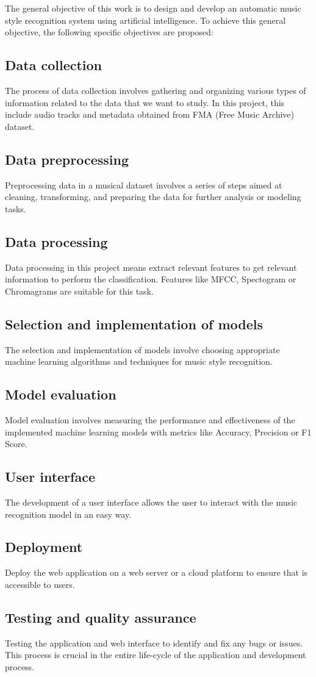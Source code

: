 The general objective of this work is to design and develop an automatic music style recognition system using artificial intelligence. 
To achieve this general objective, the following specific objectives are proposed:

\subsection{Data collection}
The process of data collection involves gathering and organizing various types of information related to the data that we want to study. In this project, this include audio tracks and metadata obtained from FMA (Free Music Archive) dataset.
\subsection{Data preprocessing}
Preprocessing data in a musical dataset involves a series of steps aimed at cleaning, transforming, and preparing the data for further analysis or modeling tasks.
\subsection{Data processing}
Data processing in this project means extract relevant features to get relevant information to perform the classification. Features like MFCC, Spectogram  or Chromagrams are suitable for this task.
\subsection{Selection and implementation of models}
The selection and implementation of models involve choosing appropriate machine learning algorithms and techniques for music style recognition.
\subsection{Model evaluation}
Model evaluation involves measuring the performance and effectiveness of the implemented machine learning models with metrics like Accuracy, Precision or F1 Score.
\subsection{User interface}
The development of a user interface allows the user to interact with the music recognition model in an easy way.
\subsection{Deployment}
Deploy the web application on a web server or a cloud platform to ensure that is accessible to users.
\subsection{Testing and quality assurance}
Testing the application and web interface to identify and fix any bugs or issues. This process is crucial in the entire life-cycle of the application and development process.